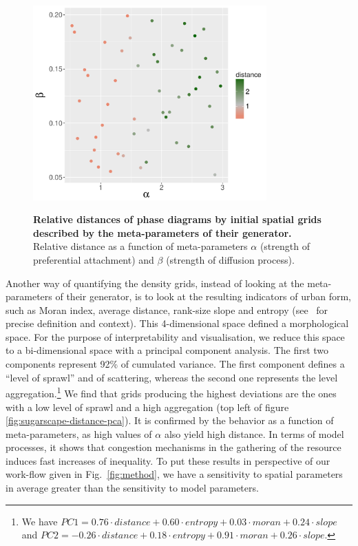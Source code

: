 \documentclass[3p,times,procedia]{elsarticle}
\begin{document}
\begin{figure}
\centering
\includegraphics[width=0.8\textwidth]{figures/relativedistance_metaparams}\\
\caption{\textbf{Relative distances of phase diagrams by initial spatial grids described by the meta-parameters of their generator.} Relative distance as a function of meta-parameters $\alpha$ (strength of preferential attachment) and $\beta$ (strength of diffusion process).}
\label{fig:sugarscape-distance-meta}
\end{figure}

Another way of quantifying the density grids, instead of looking at the meta-parameters of their generator, is to look at the resulting indicators of urban form, such as Moran index, average distance, rank-size slope and entropy (see~\cite{LeNechet2015} for precise definition and context). This 4-dimensional space defined a morphological space. For the purpose of interpretability and visualisation, we reduce this space to a bi-dimensional space with a principal component analysis. The first two components represent 92\% of cumulated variance. The first component defines a ``level of sprawl'' and of scattering, whereas the second one represents the level aggregation.\footnote{We have $PC1 = 0.76\cdot distance + 0.60\cdot entropy + 0.03\cdot moran + 0.24\cdot slope$ and $PC2 = -0.26\cdot distance + 0.18\cdot entropy + 0.91\cdot moran + 0.26\cdot slope$.} We find that grids producing the highest deviations are the ones with a low level of sprawl and a high aggregation (top left of figure \ref{fig:sugarscape-distance-pca}). It is confirmed by the behavior as a function of meta-parameters, as high values of $\alpha$ also yield high distance. In terms of model processes, it shows that congestion mechanisms in the gathering of the resource induces fast increases of inequality. To put these results in perspective of our work-flow given in Fig.~\ref{fig:method}, we have a sensitivity to spatial parameters in average greater than the sensitivity to model parameters.
\end{document}
